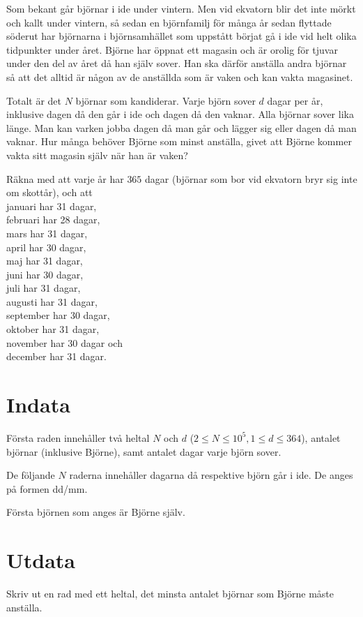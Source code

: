Som bekant går björnar i ide under vintern. Men vid ekvatorn blir det inte mörkt och kallt under vintern,
så sedan en björnfamilj för många år sedan flyttade söderut har björnarna i björnsamhället som uppstått
börjat gå i ide vid helt olika tidpunkter under året.
Björne har öppnat ett magasin och är orolig för tjuvar under den del av året då han själv sover.
Han ska därför anställa andra björnar så att det alltid är någon av de anställda som är vaken och kan vakta magasinet.

Totalt är det $N$ björnar som kandiderar. Varje björn sover $d$ dagar per år,
inklusive dagen då den går i ide och dagen då den vaknar. Alla björnar sover lika länge.
Man kan varken jobba dagen då man går och lägger sig eller dagen då man vaknar.
Hur många behöver Björne som minst anställa, givet att Björne kommer vakta sitt magasin själv när han är vaken?

Räkna med att varje år har $365$ dagar (björnar som bor vid ekvatorn bryr sig inte om skottår), och att \\
januari har 31 dagar, \\
februari har 28 dagar, \\
mars har 31 dagar, \\
april har 30 dagar, \\
maj har 31 dagar, \\ 
juni har 30 dagar, \\
juli har 31 dagar, \\
augusti har 31 dagar, \\
september har 30 dagar, \\
oktober har 31 dagar, \\
november har 30 dagar och \\
december har 31 dagar.

\section*{Indata}
Första raden innehåller två heltal $N$ och $d$ ($2 \leq N \leq 10^5, 1 \leq d \leq 364$), antalet björnar (inklusive Björne),
samt antalet dagar varje björn sover.

De följande $N$ raderna innehåller dagarna då respektive björn går i ide. De anges på formen dd/mm.

Första björnen som anges är Björne själv.

\section*{Utdata}
Skriv ut en rad med ett heltal, det minsta antalet björnar som Björne måste anställa.

